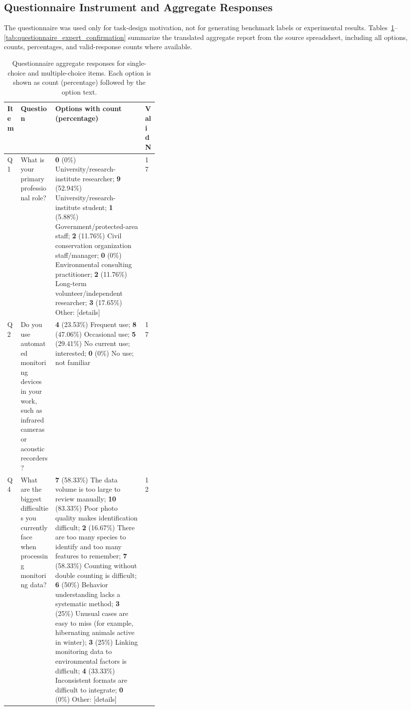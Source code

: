 \subsection{Questionnaire Instrument and Aggregate Responses}
\label{app:questionnaire_instrument}

The questionnaire was used only for task-design motivation, not for generating benchmark labels or experimental results. Tables~\ref{tab:questionnaire_choice_summary}--\ref{tab:questionnaire_expert_confirmation} summarize the translated aggregate report from the source spreadsheet, including all options, counts, percentages, and valid-response counts where available.

\begin{table}[h]
\centering
\caption{Questionnaire aggregate responses for single-choice and multiple-choice items. Each option is shown as count (percentage) followed by the option text.}
\label{tab:questionnaire_choice_summary}
\scriptsize
\setlength{\tabcolsep}{3pt}
\begin{tabularx}{\textwidth}{p{0.05\linewidth}p{0.23\linewidth}X p{0.08\linewidth}}
\toprule
Item & Question & Options with count (percentage) & Valid N \\
\midrule
Q1 & What is your primary professional role? & \textbf{0} (0\%) University/research-institute researcher; \textbf{9} (52.94\%) University/research-institute student; \textbf{1} (5.88\%) Government/protected-area staff; \textbf{2} (11.76\%) Civil conservation organization staff/manager; \textbf{0} (0\%) Environmental consulting practitioner; \textbf{2} (11.76\%) Long-term volunteer/independent researcher; \textbf{3} (17.65\%) Other: [details] & 17 \\
Q2 & Do you use automated monitoring devices in your work, such as infrared cameras or acoustic recorders? & \textbf{4} (23.53\%) Frequent use; \textbf{8} (47.06\%) Occasional use; \textbf{5} (29.41\%) No current use; interested; \textbf{0} (0\%) No use; not familiar & 17 \\
Q4 & What are the biggest difficulties you currently face when processing monitoring data? & \textbf{7} (58.33\%) The data volume is too large to review manually; \textbf{10} (83.33\%) Poor photo quality makes identification difficult; \textbf{2} (16.67\%) There are too many species to identify and too many features to remember; \textbf{7} (58.33\%) Counting without double counting is difficult; \textbf{6} (50\%) Behavior understanding lacks a systematic method; \textbf{3} (25\%) Unusual cases are easy to miss (for example, hibernating animals active in winter); \textbf{3} (25\%) Linking monitoring data to environmental factors is difficult; \textbf{4} (33.33\%) Inconsistent formats are difficult to integrate; \textbf{0} (0\%) Other: [details] & 12 \\

\end{tabularx}
\end{table}
